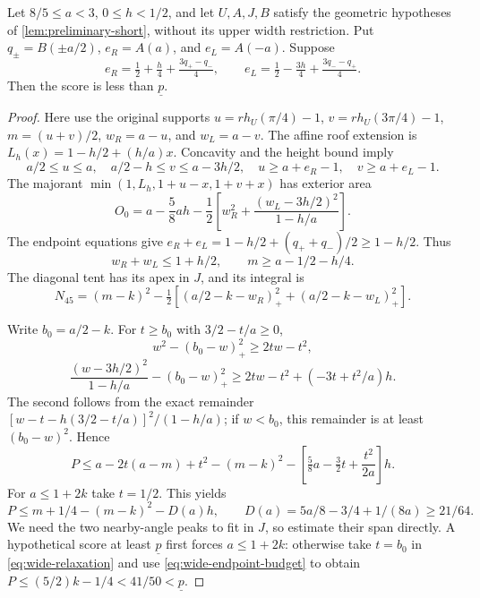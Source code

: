 \begin{lemma}\label{lem:preliminary-wide}
Let $8/5\le a<3$, $0\le h<1/2$, and let $U,A,J,B$ satisfy the
geometric hypotheses of \cref{lem:preliminary-short}, without its
upper width restriction. Put $q_\pm=B(\pm a/2)$,
$e_R=A(a)$, and $e_L=A(-a)$. Suppose
\begin{equation}\label{eq:preliminary-endpoint-laws}
 e_R=\tfrac12+\tfrac h4+\tfrac{3q_+-q_-}{4},\qquad
 e_L=\tfrac12-\tfrac{3h}{4}+\tfrac{3q_--q_+}{4}.
\end{equation}
Then the score is less than $\underline p$.
\end{lemma}
\begin{proof}
Here use the original supports
$u=rh_U(\pi/4)-1$, $v=rh_U(3\pi/4)-1$,
$m=(u+v)/2$, $w_R=a-u$, and $w_L=a-v$.
The affine roof extension is $L_h(x)=1-h/2+(h/a)x$.
Concavity and the height bound imply
\[
 a/2\le u\le a,\quad a/2-h\le v\le a-3h/2,\quad
 u\ge a+e_R-1,\quad v\ge a+e_L-1.
\]
The majorant $\min(1,L_h,1+u-x,1+v+x)$ has exterior area
\[
 O_0=a-\frac58ah-\frac12
       \left[w_R^2+\frac{(w_L-3h/2)^2}{1-h/a}\right].
\]
The endpoint equations give
$e_R+e_L=1-h/2+(q_++q_-)/2\ge1-h/2$. Thus
\begin{equation}\label{eq:wide-endpoint-budget}
 w_R+w_L\le1+h/2,\qquad m\ge a-1/2-h/4.
\end{equation}
The diagonal tent has its apex in $J$, and its integral is
\[
 N_{45}=(m-k)^2-\tfrac12
       [(a/2-k-w_R)_+^2+(a/2-k-w_L)_+^2].
\]

Write $b_0=a/2-k$. For $t\ge b_0$ with $3/2-t/a\ge0$,
\[
 w^2-(b_0-w)_+^2\ge2tw-t^2,
\]
\[
 \frac{(w-3h/2)^2}{1-h/a}-(b_0-w)_+^2
 \ge2tw-t^2+(-3t+t^2/a)h.
\]
The second follows from the exact remainder
$[w-t-h(3/2-t/a)]^2/(1-h/a)$; if $w<b_0$, this remainder
is at least $(b_0-w)^2$. Hence
\begin{equation}\label{eq:wide-relaxation}
 P\le a-2t(a-m)+t^2-(m-k)^2
       -\left[\tfrac58a-\tfrac32t+\frac{t^2}{2a}\right]h.
\end{equation}
For $a\le1+2k$ take $t=1/2$. This yields
\[
 P\le m+1/4-(m-k)^2-D(a)h,\qquad
 D(a)=5a/8-3/4+1/(8a)\ge21/64.
\]
We need the two nearby-angle peaks to fit in $J$, so estimate their
span directly. A hypothetical score at least $\underline p$ first forces
$a\le1+2k$: otherwise take $t=b_0$ in
\cref{eq:wide-relaxation} and use \cref{eq:wide-endpoint-budget} to obtain
$P\le(5/2)k-1/4<41/50<\underline p$.


\end{proof}
